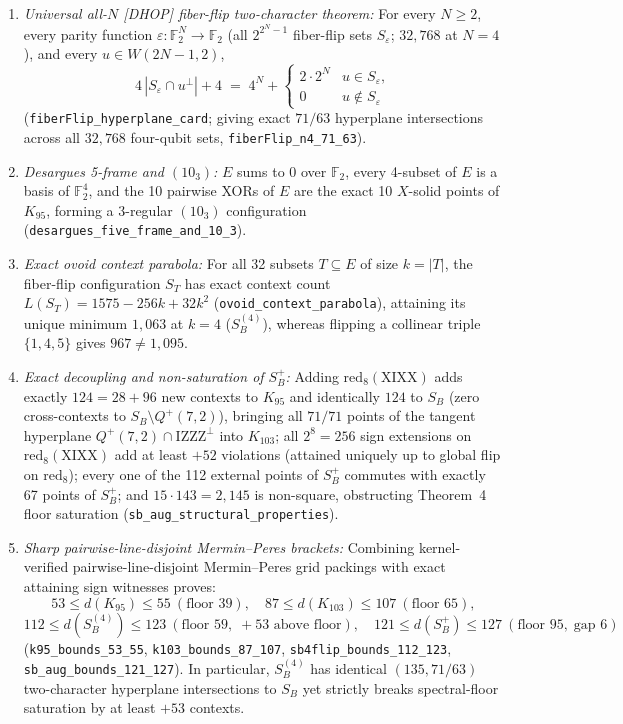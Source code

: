 \documentclass[11pt,a4paper]{article}
\providecommand{\tightlist}{\setlength{\itemsep}{0pt}\setlength{\parskip}{0pt}}
\begin{document}
\begin{enumerate}
\def\labelenumi{\arabic{enumi}.}
\tightlist
\item
  \emph{Universal all-\(N\) {[}DHOP{]} fiber-flip two-character theorem:} For every \(N \ge 2\), every parity function \(\varepsilon : \mathbb{F}_2^N \to \mathbb{F}_2\) (all \(2^{2^N-1}\) fiber-flip sets \(S_\varepsilon\); \(32{,}768\) at \(N=4\)), and every \(u \in W(2N-1,2)\),
  \[4\,|S_\varepsilon \cap u^\perp| + 4 \;=\; 4^N + \begin{cases} 2\cdot 2^N & u \in S_\varepsilon, \\ 0 & u \notin S_\varepsilon \end{cases}\]
  (\nolinkurl{fiberFlip_hyperplane_card}; giving exact \(71/63\) hyperplane intersections across all \(32{,}768\) four-qubit sets, \nolinkurl{fiberFlip_n4_71_63}).
\item
  \emph{Desargues 5-frame and \((10_3)\):} \(E\) sums to \(0\) over \(\mathbb{F}_2\), every 4-subset of \(E\) is a basis of \(\mathbb{F}_2^4\), and the 10 pairwise XORs of \(E\) are the exact 10 \(X\)-solid points of \(K_{95}\), forming a 3-regular \((10_3)\) configuration (\nolinkurl{desargues_five_frame_and_10_3}).
\item
  \emph{Exact ovoid context parabola:} For all 32 subsets \(T \subseteq E\) of size \(k = |T|\), the fiber-flip configuration \(S_T\) has exact context count \(L(S_T) = 1575 - 256k + 32k^2\) (\nolinkurl{ovoid_context_parabola}), attaining its unique minimum \(1{,}063\) at \(k = 4\) (\(S_B^{(4)}\)), whereas flipping a collinear triple \(\{1, 4, 5\}\) gives \(967 \ne 1{,}095\).
\item
  \emph{Exact decoupling and non-saturation of \(S_B^+\):} Adding \(\mathrm{red}_8(\mathrm{XIXX})\) adds exactly \(124 = 28 + 96\) new contexts to \(K_{95}\) and identically \(124\) to \(S_B\) (zero cross-contexts to \(S_B \setminus Q^+(7,2)\)), bringing all \(71/71\) points of the tangent hyperplane \(Q^+(7,2) \cap \mathrm{IZZZ}^\perp\) into \(K_{103}\); all \(2^8 = 256\) sign extensions on \(\mathrm{red}_8(\mathrm{XIXX})\) add at least \(+52\) violations (attained uniquely up to global flip on \(\mathrm{red}_8\)); every one of the 112 external points of \(S_B^+\) commutes with exactly 67 points of \(S_B^+\); and \(15 \cdot 143 = 2{,}145\) is non-square, obstructing Theorem~4 floor saturation (\nolinkurl{sb_aug_structural_properties}).
\item
  \emph{Sharp pairwise-line-disjoint Mermin--Peres brackets:} Combining kernel-verified pairwise-line-disjoint Mermin--Peres grid packings with exact attaining sign witnesses proves:
  \[53 \le d(K_{95}) \le 55\ (\text{floor }39), \quad 87 \le d(K_{103}) \le 107\ (\text{floor }65),\]
  \[112 \le d(S_B^{(4)}) \le 123\ (\text{floor }59,\; +53\text{ above floor}), \quad 121 \le d(S_B^+) \le 127\ (\text{floor }95,\; \text{gap }6)\]
  (\nolinkurl{k95_bounds_53_55}, \nolinkurl{k103_bounds_87_107}, \nolinkurl{sb4flip_bounds_112_123}, \nolinkurl{sb_aug_bounds_121_127}). In particular, \(S_B^{(4)}\) has identical \((135, 71/63)\) two-character hyperplane intersections to \(S_B\) yet strictly breaks spectral-floor saturation by at least \(+53\) contexts.
\end{enumerate}
\end{document}
